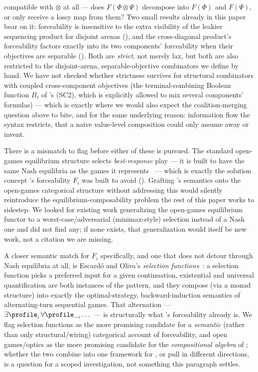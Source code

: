 \begin{enumerate}[nosep]
  compatible with $\otimes$ at all --- does $F(\Phi\otimes\Psi)$ decompose
  into $F(\Phi)$ and $F(\Psi)$, or only receive a lossy map from them? Two
  small results already in this paper bear on it: forceability is insensitive
  to the extra visibility of the leakier sequencing product for disjoint
  arenas (), and the cross-diagonal
  product's forceability factors exactly into its two components' forceability
  when their objectives are separable ().
  Both are \emph{strict}, not merely lax, but both are also restricted to the
  disjoint-arena, separable-objective combinators we define by hand. We have
  not checked whether strictness survives for structural combinators with
  coupled cross-component objectives (the terminal-combining Boolean function
  $B_\ell$ of 's (SC2), which is explicitly
  allowed to mix several components' formulas) --- which is exactly where we
  would also expect the coalition-merging question above to bite, and for the
  same underlying reason: information flow the syntax restricts, that a naive
  value-level composition could only assume away or invent.
\end{enumerate}

There is a mismatch to flag before either of these is pursued. The standard
open-games equilibrium structure selects \emph{best-response} play --- it is
built to have the same Nash equilibria as the games it
represents~\cite{GhaniHedgesWinschelZahn2018CompositionalGameTheory} --- which
is exactly the solution concept \KFOL's forceability $F_i$ was built to avoid
(). Grafting \KFOL's semantics onto the open-games
categorical structure without addressing this would silently reintroduce the
equilibrium-composability problem the rest of this paper works to sidestep.
We looked for existing work generalizing the open-games equilibrium functor to
a worst-case/adversarial (minimax-style) selection instead of a Nash one and
did not find any; if none exists, that generalization would itself be new
work, not a citation we are missing.

A closer semantic match for $F_i$ specifically, and one that does not detour
through Nash equilibria at all, is Escard\'o and Oliva's \emph{selection
functions}~\cite{EscardoOliva2010SelectionFunctions}: a selection function
picks a preferred input for a given continuation, existential and universal
quantification are both instances of the pattern, and they compose (via a
monad structure) into exactly the optimal-strategy, backward-induction
semantics of alternating-turn sequential games. That alternation ---
$\exists\profile_i\,\forall\profile_{-i}\dots$ --- is structurally what
's forceability already is. We flag selection functions as
the more promising candidate for a \emph{semantic} (rather than only
structural/wiring) categorical account of forceability, and open
games/optics as the more promising candidate for the \emph{compositional
algebra} of ; whether the two combine into one
framework for \KFOL, or pull in different directions, is a question for a
scoped investigation, not something this paragraph settles.

